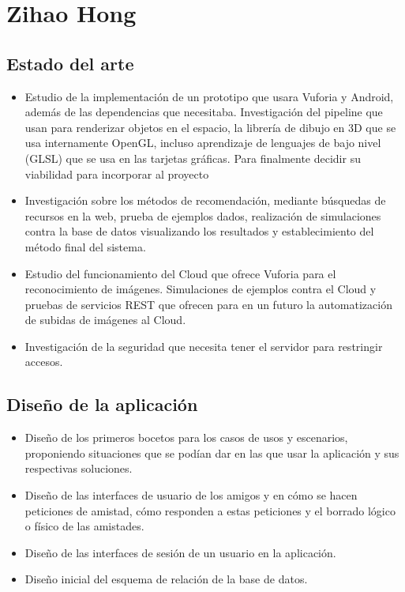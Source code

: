 \section{Zihao Hong}
\label{makereference7.4}
    \subsection{Estado del arte}
    \label{makereference7.4.1}
        \begin{itemize}
            \item Estudio de la implementación de un prototipo que usara Vuforia y Android, además de las dependencias que necesitaba. Investigación del pipeline 
            que usan para renderizar objetos en el espacio, la librería de dibujo en 3D que se usa internamente OpenGL, 
            incluso aprendizaje de lenguajes de bajo nivel (GLSL) que se usa en las tarjetas gráficas. Para finalmente 
            decidir su viabilidad para incorporar al proyecto
            \item Investigación sobre los métodos de recomendación, mediante búsquedas de recursos en la web, prueba de 
            ejemplos dados, realización de simulaciones contra la base de datos visualizando los resultados y establecimiento 
            del método final del sistema.
            \item Estudio del funcionamiento del Cloud que ofrece Vuforia para el reconocimiento de imágenes. Simulaciones de ejemplos contra el Cloud y pruebas de servicios REST que ofrecen para 
            en un futuro la automatización de subidas de imágenes al Cloud.
            \item Investigación de la seguridad que necesita tener el servidor para restringir accesos.
        \end{itemize}
    \subsection{Diseño de la aplicación}
    \label{makereference7.4.2}
        \begin{itemize}
            \item Diseño de los primeros bocetos para los casos de usos y escenarios, proponiendo situaciones que se 
            podían dar en las que usar la aplicación y sus respectivas soluciones.
            \item Diseño de las interfaces de usuario de los amigos y en cómo se hacen peticiones de amistad, cómo responden a estas peticiones y el
            borrado lógico o físico de las amistades.
            \item Diseño de las interfaces de sesión de un usuario en la aplicación.
            \item Diseño inicial del esquema de relación de la base de datos.
        \end{itemize}
